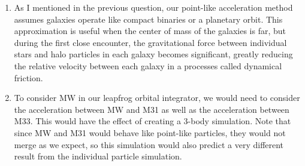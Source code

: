 \documentclass{article}
\begin{document}
\begin{enumerate}
    \item As I mentioned in the previous question, our point-like
      acceleration method assumes galaxies operate like compact
      binaries or a planetary orbit. This approximation is useful when
      the center of mass of the galaxies is far, but during the first
      close encounter, the gravitational force between individual
      stars and halo particles in each galaxy becomes significant,
      greatly reducing the relative velocity between each galaxy in a
      processes called dynamical friction.
      
    \item To consider MW in our leapfrog orbital integrator, we would
      need to consider the acceleration between MW and M31 as well as
      the acceleration between M33. This would have the effect of
      creating a 3-body simulation. Note that since MW and M31 would
      behave like point-like particles, they would not merge as we
      expect, so this simulation would also predict a very different
      result from the individual particle simulation.

    \end{enumerate}
\end{document}
